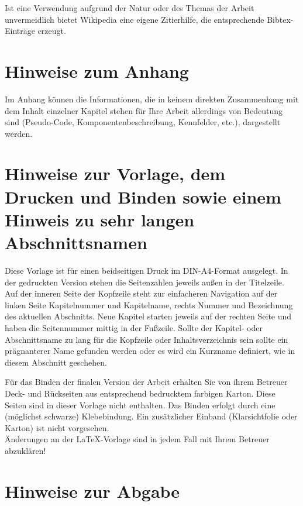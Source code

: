 Ist eine Verwendung aufgrund der Natur oder des Themas der Arbeit unvermeidlich bietet Wikipedia eine eigene \glqq Zitierhilfe\grqq, die entsprechende Bibtex-Einträge erzeugt.

\section{Hinweise zum Anhang}
\label{hinweise:anhang}

Im Anhang können die Informationen, die in keinem direkten
Zusammenhang mit dem Inhalt einzelner Kapitel stehen für Ihre
Arbeit allerdings von Bedeutung sind (Pseudo-Code,
Komponentenbeschreibung, Kennfelder, etc.), dargestellt werden.

\section[Vorlage, Drucken und Binden]{Hinweise zur Vorlage, dem Drucken und Binden sowie einem Hinweis zu sehr langen Abschnittsnamen}
\label{hinweise:vorlage}

Diese Vorlage ist für einen beidseitigen Druck im DIN-A4-Format ausgelegt. In der gedruckten Version stehen die Seitenzahlen jeweils außen in der Titelzeile. Auf der inneren Seite der Kopfzeile steht zur einfacheren Navigation auf der linken Seite Kapitelnummer und Kapitelname, rechts Nummer und Bezeichnung des aktuellen Abschnitts. Neue Kapitel starten jeweils auf der rechten Seite und haben die Seitennummer mittig in der Fußzeile.
Sollte der Kapitel- oder Abschnittsname zu lang für die Kopfzeile oder Inhaltsverzeichnis sein sollte ein prägnanterer Name gefunden werden oder es wird ein Kurzname definiert, wie in diesem Abschnitt geschehen.

Für das Binden der finalen Version der Arbeit erhalten Sie von ihrem Betreuer Deck- und Rückseiten aus entsprechend bedrucktem farbigen Karton. Diese Seiten sind in dieser Vorlage nicht enthalten. Das Binden erfolgt durch eine (möglichst schwarze) Klebebindung. Ein zusätzlicher Einband (Klarsichtfolie oder Karton) ist nicht vorgesehen.\\

Änderungen an der \LaTeX-Vorlage sind in jedem Fall mit Ihrem Betreuer abzuklären!\\


\section{Hinweise zur Abgabe}
\label{hinweise:abgabe}

